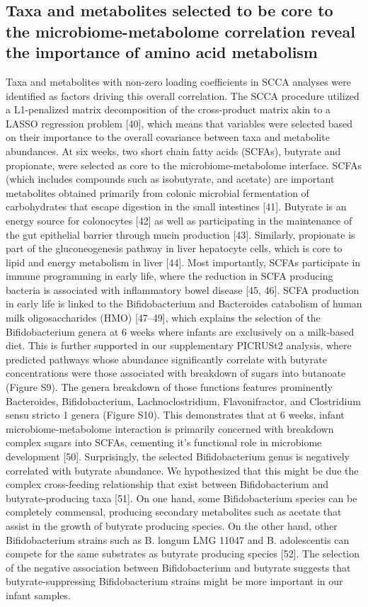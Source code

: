 \subsection{Taxa and metabolites selected to be core to the microbiome-metabolome correlation reveal the importance of amino acid metabolism}  
Taxa and metabolites with non-zero loading coefficients in SCCA analyses were identified as factors driving this overall correlation. The SCCA procedure utilized a L1-penalized matrix decomposition of the cross-product matrix akin to a LASSO regression problem [40], which means that variables were selected based on their importance to the overall covariance between taxa and metabolite abundances. 
At six weeks, two short chain fatty acids (SCFAs), butyrate and propionate, were selected as core to the microbiome-metabolome interface. SCFAs (which includes compounds such as isobutyrate, and acetate) are important metabolites obtained primarily from colonic microbial fermentation of carbohydrates that escape digestion in the small intestines [41]. Butyrate is an energy source for colonocytes [42] as well as participating in the maintenance of the gut epithelial barrier through mucin production [43]. Similarly, propionate is part of the gluconeogenesis pathway in liver hepatocyte cells, which is core to lipid and energy metabolism in liver [44]. Most importantly, SCFAs participate in immune programming in early life, where the reduction in SCFA producing bacteria is associated with inflammatory bowel disease [45, 46]. 
SCFA production in early life is linked to the Bifidobacterium and Bacteroides catabolism of human milk oligosaccharides (HMO) [47–49], which explains the selection of the Bifidobacterium genera at 6 weeks where infants are exclusively on a milk-based diet. This is further supported in our supplementary PICRUSt2 analysis, where predicted pathways whose abundance significantly correlate with butyrate concentrations were those associated with breakdown of sugars into butanoate (Figure S9). The genera breakdown of those functions features prominently Bacteroides, Bifidobacterium, Lachnoclostridium, Flavonifractor, and Clostridium sensu stricto 1 genera (Figure S10). This demonstrates that at 6 weeks, infant microbiome-metabolome interaction is primarily concerned with breakdown complex sugars into SCFAs, cementing it’s functional role in microbiome development [50]. 
Surprisingly, the selected Bifidobacterium genus is negatively correlated with butyrate abundance. We hypothesized that this might be due the complex cross-feeding relationship that exist between Bifidobacterium and butyrate-producing taxa [51]. On one hand, some Bifidobacterium species can be completely commensal, producing secondary metabolites such as acetate that assist in the growth of butyrate producing species. On the other hand, other Bifidobacterium strains such as B. longum LMG 11047 and B. adolescentis can compete for the same substrates as butyrate producing species [52]. The selection of the negative association between Bifidobacterium and butyrate suggests that butyrate-suppressing Bifidobacterium strains might be more important in our infant samples. 
